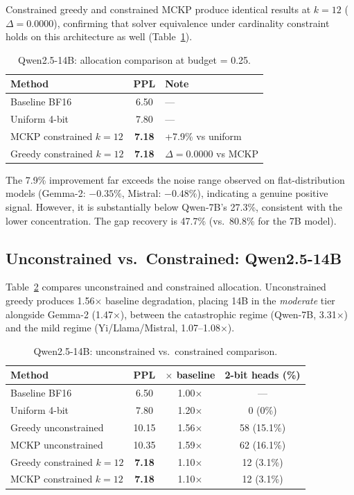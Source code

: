 \documentclass[11pt,a4paper]{article}
\begin{document}
Constrained greedy and constrained MCKP produce identical results at $k = 12$ ($\Delta = 0.0000$), confirming that solver equivalence under cardinality constraint holds on this architecture as well (Table~\ref{tab:14b_allocation}).

\begin{table}[t]
\centering
\caption{Qwen2.5-14B: allocation comparison at budget = 0.25.}
\label{tab:14b_allocation}
\begin{tabular}{lcl}
\toprule
Method & PPL & Note \\
\midrule
Baseline BF16        & 6.50 & --- \\
Uniform 4-bit        & 7.80 & --- \\
MCKP constrained $k{=}12$  & \textbf{7.18} & +7.9\% vs uniform \\
Greedy constrained $k{=}12$ & \textbf{7.18} & $\Delta = 0.0000$ vs MCKP \\
\bottomrule
\end{tabular}
\end{table}

The 7.9\% improvement far exceeds the noise range observed on flat-distribution models (Gemma-2: $-0.35\%$, Mistral: $-0.48\%$), indicating a genuine positive signal.
However, it is substantially below Qwen-7B's 27.3\%, consistent with the lower concentration.
The gap recovery is 47.7\% (vs.\ 80.8\% for the 7B model).

\subsection{Unconstrained vs.\ Constrained: Qwen2.5-14B}
\label{sec:unconstrained_14b}

Table~\ref{tab:14b_unconstrained} compares unconstrained and constrained allocation.
Unconstrained greedy produces 1.56$\times$ baseline degradation, placing 14B in the \emph{moderate} tier alongside Gemma-2 (1.47$\times$), between the catastrophic regime (Qwen-7B, 3.31$\times$) and the mild regime (Yi/Llama/Mistral, 1.07--1.08$\times$).

\begin{table}[t]
\centering
\caption{Qwen2.5-14B: unconstrained vs.\ constrained comparison.}
\label{tab:14b_unconstrained}
\begin{tabular}{lccc}
\toprule
Method & PPL & $\times$ baseline & 2-bit heads (\%) \\
\midrule
Baseline BF16              & 6.50  & 1.00$\times$ & --- \\
Uniform 4-bit              & 7.80  & 1.20$\times$ & 0 (0\%) \\
Greedy unconstrained       & 10.15 & 1.56$\times$ & 58 (15.1\%) \\
MCKP unconstrained         & 10.35 & 1.59$\times$ & 62 (16.1\%) \\
Greedy constrained $k{=}12$  & \textbf{7.18}  & 1.10$\times$ & 12 (3.1\%) \\
MCKP constrained $k{=}12$    & \textbf{7.18}  & 1.10$\times$ & 12 (3.1\%) \\
\bottomrule
\end{tabular}
\end{table}
\end{document}
